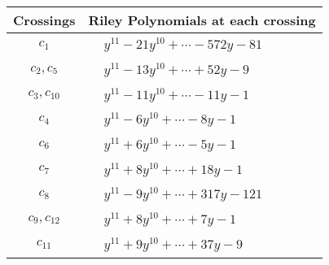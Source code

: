 \documentclass[1p]{elsarticle_modified}
\theoremstyle{definition}
\begin{document}
\begin{tabular}{m{50pt}|m{274pt}}
Crossings & \hspace{64pt}Riley Polynomials at each crossing \\
\hline $$\begin{aligned}c_{1}\end{aligned}$$&$\begin{aligned}
&y^{11}-21 y^{10}+\cdots-572 y-81
\end{aligned}$\\
\hline $$\begin{aligned}c_{2},c_{5}\end{aligned}$$&$\begin{aligned}
&y^{11}-13 y^{10}+\cdots+52 y-9
\end{aligned}$\\
\hline $$\begin{aligned}c_{3},c_{10}\end{aligned}$$&$\begin{aligned}
&y^{11}-11 y^{10}+\cdots-11 y-1
\end{aligned}$\\
\hline $$\begin{aligned}c_{4}\end{aligned}$$&$\begin{aligned}
&y^{11}-6 y^{10}+\cdots-8 y-1
\end{aligned}$\\
\hline $$\begin{aligned}c_{6}\end{aligned}$$&$\begin{aligned}
&y^{11}+6 y^{10}+\cdots-5 y-1
\end{aligned}$\\
\hline $$\begin{aligned}c_{7}\end{aligned}$$&$\begin{aligned}
&y^{11}+8 y^{10}+\cdots+18 y-1
\end{aligned}$\\
\hline $$\begin{aligned}c_{8}\end{aligned}$$&$\begin{aligned}
&y^{11}-9 y^{10}+\cdots+317 y-121
\end{aligned}$\\
\hline $$\begin{aligned}c_{9},c_{12}\end{aligned}$$&$\begin{aligned}
&y^{11}+8 y^{10}+\cdots+7 y-1
\end{aligned}$\\
\hline $$\begin{aligned}c_{11}\end{aligned}$$&$\begin{aligned}
&y^{11}+9 y^{10}+\cdots+37 y-9
\end{aligned}$\\
\hline
\end{tabular}\\~\\
\end{document}

